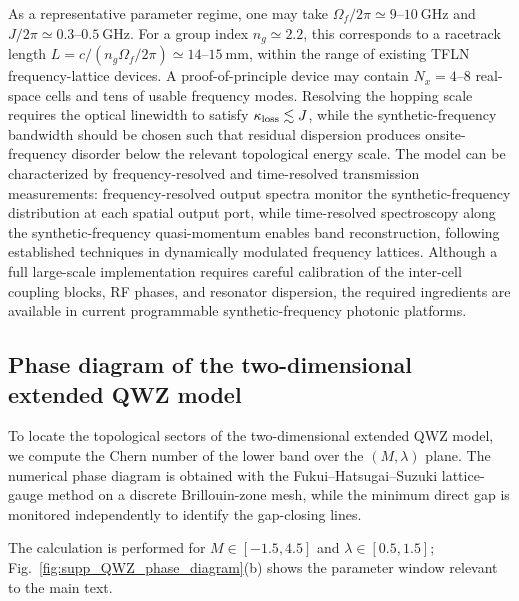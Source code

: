 \documentclass[aps,prl,twocolumn,preprintnumbers,amsmath,amssymb,superscriptaddress,10pt]{revtex4-2}
\begin{document}
As a representative parameter regime, one may take
$\Omega_f/2\pi\simeq 9$--$10~\mathrm{GHz}$ and
$J/2\pi\simeq 0.3$--$0.5~\mathrm{GHz}$. For a group index
$n_g\simeq2.2$, this corresponds to a racetrack length
$L=c/(n_g\Omega_f/2\pi)\simeq 14$--$15~\mathrm{mm}$, within the range of existing TFLN frequency-lattice devices. A proof-of-principle device may contain $N_x=4$--$8$ real-space cells and tens of usable frequency modes. Resolving the hopping scale requires the optical linewidth to satisfy $\kappa_{\rm loss}\lesssim J$, while the synthetic-frequency bandwidth should be chosen such that residual dispersion produces onsite-frequency disorder below the relevant topological energy scale. The model can be characterized by frequency-resolved and time-resolved transmission measurements: frequency-resolved output spectra monitor the synthetic-frequency distribution at each spatial output port, while time-resolved spectroscopy along the synthetic-frequency quasi-momentum enables band reconstruction, following established techniques in dynamically modulated frequency lattices. Although a full large-scale implementation requires careful calibration of the inter-cell coupling blocks, RF phases, and resonator dispersion, the required ingredients are available in current programmable synthetic-frequency photonic platforms.
  




\subsection{Phase diagram of the two-dimensional extended QWZ model}
\label{sec:supp_QWZ_phase_diagram}

To locate the topological sectors of the two-dimensional extended QWZ model, we compute the Chern number of the lower band over the $(M,\lambda)$ plane. The numerical phase diagram is obtained with the Fukui--Hatsugai--Suzuki lattice-gauge method on a discrete Brillouin-zone mesh, while the minimum direct gap is monitored independently to identify the gap-closing lines.

The calculation is performed for $M\in[-1.5,4.5]$ and $\lambda\in[0.5,1.5]$; Fig.~\ref{fig:supp_QWZ_phase_diagram}(b) shows the parameter window relevant to the main text.
\end{document}
